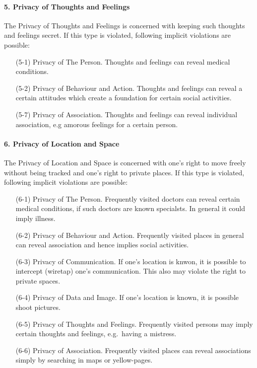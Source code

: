 \paragraph*{5. Privacy of Thoughts and Feelings}

The Privacy of Thoughts and Feelings is concerned with keeping such
thoughts and feelings secret. If this type is violated, following
implicit violations are possible:

\begin{itemize}
\item [(5-1)] Privacy of The Person.
  Thoughts and feelings can reveal medical conditions.
\item [(5-2)] Privacy of Behaviour and Action.
  Thoughts and feelings can reveal a certain attitudes which create a foundation for certain   social activities.
\item [(5-7)] Privacy of Association.
  Thoughts and feelings can reveal individual association, e.g amorous feelings for a certain person.
\end{itemize}

\paragraph*{6. Privacy of Location and Space}

The Privacy of Location and Space is concerned with one's right to move freely without being tracked and one's right to private places.
If this type is violated, following implicit violations are possible:

\begin{itemize}
\item [(6-1)] Privacy of The Person.
  Frequently visited doctors can reveal certain medical conditions, if such doctors are known specialsts.
  In general it could imply illness.
\item [(6-2)] Privacy of Behaviour and Action.
  Frequently visited places in general can reveal association and hence implies social activities.
\item [(6-3)] Privacy of Communication.
  If one's location is knwon, it is possible to intercept (wiretap) one's communication.
  This also may violate the right to private spaces.
\item [(6-4)] Privacy of Data and Image.
  If one's location is known, it is possible shoot pictures.
\item [(6-5)] Privacy of Thoughts and Feelings.
  Frequently visited persons may imply certain thoughts and feelings, e.g.~having a mistress.
\item [(6-6)] Privacy of Association.
  Frequently visited places can reveal associations simply by searching in maps or yellow-pages.
\end{itemize}

